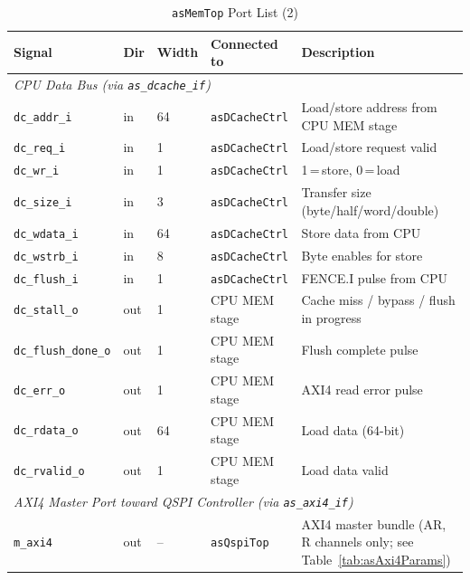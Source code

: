 \begin{table}[H]
\caption{\texttt{asMemTop} Port List (2)}
\label{tab:asMemTopPorts2}
\centering
\begin{tabularx}{\textwidth}{|l |l |l |l |X|}
  \hline
  Signal & Dir & Width & Connected to & Description \\
  \hline
  \hline
  \multicolumn{5}{|l|}{\textit{CPU Data Bus (via \texttt{as\_dcache\_if})}} \\
  \hline
  \texttt{dc\_addr\_i}        & in  & 64 & \texttt{asDCacheCtrl} & Load/store address from CPU MEM stage \\
  \hline
  \texttt{dc\_req\_i}         & in  & 1  & \texttt{asDCacheCtrl} & Load/store request valid \\
  \hline
  \texttt{dc\_wr\_i}          & in  & 1  & \texttt{asDCacheCtrl} & 1\,=\,store, 0\,=\,load \\
  \hline
  \texttt{dc\_size\_i}        & in  & 3  & \texttt{asDCacheCtrl} & Transfer size (byte/half/word/double) \\
  \hline
  \texttt{dc\_wdata\_i}       & in  & 64 & \texttt{asDCacheCtrl} & Store data from CPU \\
  \hline
  \texttt{dc\_wstrb\_i}       & in  & 8  & \texttt{asDCacheCtrl} & Byte enables for store \\
  \hline
  \texttt{dc\_flush\_i}       & in  & 1  & \texttt{asDCacheCtrl} & FENCE.I pulse from CPU \\
  \hline
  \texttt{dc\_stall\_o}       & out & 1  & CPU MEM stage         & Cache miss / bypass / flush in progress \\
  \hline
  \texttt{dc\_flush\_done\_o} & out & 1  & CPU MEM stage         & Flush complete pulse \\
  \hline
  \texttt{dc\_err\_o}         & out & 1  & CPU MEM stage         & AXI4 read error pulse \\
  \hline
  \texttt{dc\_rdata\_o}       & out & 64 & CPU MEM stage         & Load data (64-bit) \\
  \hline
  \texttt{dc\_rvalid\_o}      & out & 1  & CPU MEM stage         & Load data valid \\
  \hline
  \multicolumn{5}{|l|}{\textit{AXI4 Master Port toward QSPI Controller (via \texttt{as\_axi4\_if})}} \\
  \hline
  \texttt{m\_axi4}            & out & -- & \texttt{asQspiTop}    & AXI4 master bundle (AR, R channels only; see Table~\ref{tab:asAxi4Params}) \\
  \hline
\end{tabularx}
\end{table}


